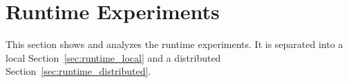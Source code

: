 \newpage
\section{Runtime Experiments}
\label{sec:runtime}

This section shows and analyzes the runtime experiments.
It is separated into a local Section~\ref{sec:runtime_local} and a distributed Section~\ref{sec:runtime_distributed}.





